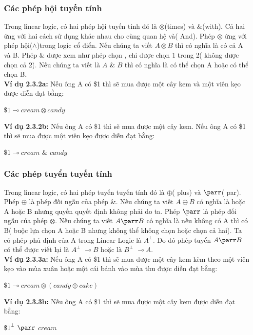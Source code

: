 \documentclass[12pt,a4paper,oneside]{article}
\begin{document}
\subsubsection{Các phép hội tuyến tính}
Trong linear logic, có hai phép hội tuyến tính đó là  $\otimes$(times) và $\&$(with). Cả hai ứng với hai cách sử dụng khác nhau cho cùng quan hệ và( And). Phép $\otimes$ ứng với phép hội($\wedge$)trong logic cổ điển. Nếu chúng ta viết $A \otimes B$ thì có nghĩa là có cả A và B. Phép $\&$ được xem như phép chọn , chỉ được chọn 1 trong 2( không được chọn cả 2). Nếu chúng ta viết là  $A$ $\&$ $B$ thì có nghĩa là có thể chọn A hoặc có thể chọn B.\\
\textbf{Ví dụ 2.3.2a: } Nếu ông A có \$1 thì sẽ mua được một cây kem và một viên kẹo được diễn đạt bằng:\\
\begin{center}
	$\$1 \multimap cream \otimes candy$
\end{center}
\textbf{Ví dụ 2.3.2b: } Nếu ông A có \$1 thì sẽ mua được một cây kem. Nếu ông A có \$1 thì sẽ mua được một viên kẹo được diễn đạt bằng:\\
\begin{center}
	$\$1 \multimap cream$ $\&$ $candy$
\end{center}
\subsubsection{Các phép tuyển tuyến tính}
Trong linear logic, có  hai phép tuyển tuyến tính đó là $\oplus$( plus) và $\parr$( par). Phép $\oplus$ là phép đối ngẫu của phép $\&$. Nếu chúng ta viết $A \oplus B$ có nghĩa là hoặc A hoặc B nhưng quyền quyết định không phải do ta. Phép $\parr$ là phép đối ngẫu của phép $\otimes$. Nếu chúng ta viết $A \parr B$ có nghĩa là nếu không có A thì có B( buộc lựa chọn A hoặc B nhưng không thể không chọn hoặc chọn cả hai). Ta có phép phủ định của A trong Linear Logic là 	$A ^\bot$. Do đó phép tuyển  $A \parr B$ có thể được viết lại là $A ^\bot$ $\multimap  B$ hoặc là $B ^\bot$ $\multimap  A$. \\
\textbf{Ví dụ 2.3.3a: } Nếu ông A có \$1 thì sẽ mua được một cây kem kèm theo một viên kẹo vào mùa xuân hoặc một cái bánh vào mùa thu được diễn đạt bằng:\\
\begin{center}
	$\$1 \multimap cream \otimes (candy \oplus cake)$
\end{center}
\textbf{Ví dụ 2.3.3b: } Nếu ông A có \$1 thì sẽ mua được một cây kem được diễn đạt bằng:\\
\begin{center}
	$\$1 ^\bot$ $\parr$ $cream$
\end{center}
\end{document}
